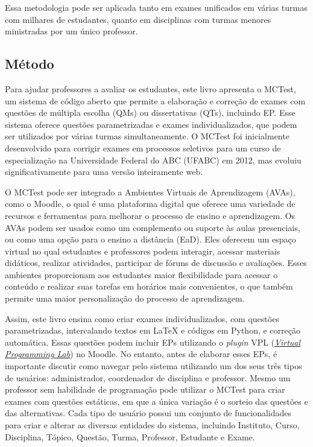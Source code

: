 Essa metodologia pode ser aplicada tanto em exames unificados em várias turmas com milhares de estudantes, quanto em disciplinas com turmas menores ministradas por um único professor.

\subsection{Método} 
Para ajudar professores a avaliar os estudantes, este livro apresenta o MCTest, um sistema de código aberto que permite a elaboração e correção de exames com questões de múltipla escolha (QMs) ou dissertativas (QTs), incluindo EP. Esse sistema oferece questões parametrizadas e exames individualizados, que podem ser utilizados por várias turmas simultaneamente. O MCTest foi inicialmente desenvolvido para corrigir exames em processos seletivos para um curso de especialização na Universidade Federal do ABC (UFABC) em 2012, mas evoluiu significativamente para uma versão inteiramente web.

O MCTest pode ser integrado a Ambientes Virtuais de Aprendizagem (AVAs), como o Moodle, o qual é uma plataforma digital que oferece uma variedade de recursos e ferramentas para melhorar o processo de ensino e aprendizagem. Os AVAs podem ser usados como um complemento ou suporte às aulas presenciais, ou como uma opção para o ensino a distância (EaD). Eles oferecem um espaço virtual no qual estudantes e professores podem interagir, acessar materiais didáticos, realizar atividades, participar de fóruns de discussão e avaliações. Esses ambientes proporcionam aos estudantes maior flexibilidade para acessar o conteúdo e realizar suas tarefas em horários mais convenientes, o que também permite uma maior personalização do processo de aprendizagem.

Assim, este livro ensina como criar exames individualizados, com questões parametrizadas, intercalando textos em \LaTeX{} e códigos em Python, e correção automática. Essas questões podem incluir EPs utilizando o \textit{plugin} VPL (\href{https://vpl.dis.ulpgc.es/}{\textit{Virtual Programming Lab}}) no Moodle.
No entanto, antes de elaborar esses EPs, é importante discutir como navegar pelo sistema utilizando um dos seus três tipos de usuários: administrador, coordenador de disciplina e professor. Mesmo um professor sem habilidade de programação pode utilizar o MCTest para criar exames com questões estáticas, em que a única variação é o sorteio das questões e das alternativas. Cada tipo de usuário possui um conjunto de funcionalidades para criar e alterar as diversas entidades do sistema, incluindo Instituto, Curso, Disciplina, Tópico, Questão, Turma, Professor, Estudante e Exame.


